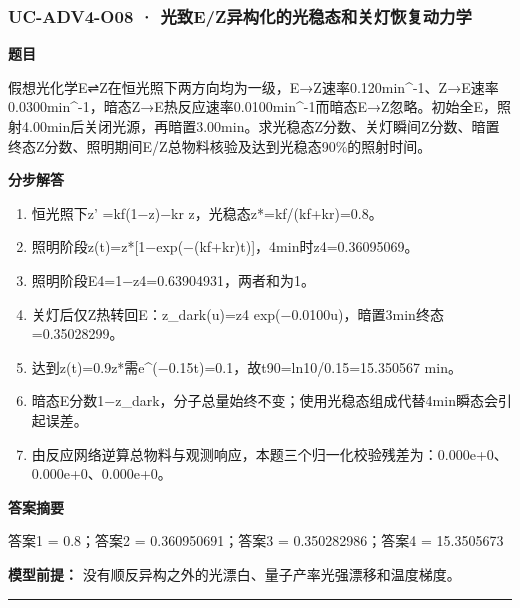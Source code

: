 \documentclass[UTF8,11pt,a4paper]{ctexart}
\begin{document}
\subsubsection*{UC-ADV4-O08 · 光致E/Z异构化的光稳态和关灯恢复动力学}
\noindent\textbf{题目}\par
假想光化学E⇌Z在恒光照下两方向均为一级，E→Z速率0.120min\textasciicircum{}-1、Z→E速率0.0300min\textasciicircum{}-1，暗态Z→E热反应速率0.0100min\textasciicircum{}-1而暗态E→Z忽略。初始全E，照射4.00min后关闭光源，再暗置3.00min。求光稳态Z分数、关灯瞬间Z分数、暗置终态Z分数、照明期间E/Z总物料核验及达到光稳态90\%的照射时间。\par
\medskip\noindent\textbf{分步解答}
\begin{enumerate}
\item 恒光照下z' =kf(1−z)−kr z，光稳态z*=kf/(kf+kr)=0.8。
\item 照明阶段z(t)=z*[1−exp(−(kf+kr)t)]，4min时z4=0.36095069。
\item 照明阶段E4=1−z4=0.63904931，两者和为1。
\item 关灯后仅Z热转回E：z\_dark(u)=z4 exp(−0.0100u)，暗置3min终态=0.35028299。
\item 达到z(t)=0.9z*需e\textasciicircum{}(−0.15t)=0.1，故t90=ln10/0.15=15.350567 min。
\item 暗态E分数1−z\_dark，分子总量始终不变；使用光稳态组成代替4min瞬态会引起误差。
\item 由反应网络逆算总物料与观测响应，本题三个归一化校验残差为：0.000e+0、0.000e+0、0.000e+0。
\end{enumerate}
\noindent\textbf{答案摘要}\par
答案1 = 0.8；答案2 = 0.360950691；答案3 = 0.350282986；答案4 = 15.3505673\par
\noindent\textbf{模型前提：}
没有顺反异构之外的光漂白、量子产率光强漂移和温度梯度。\par
\medskip\hrule\medskip
{}
\end{document}

